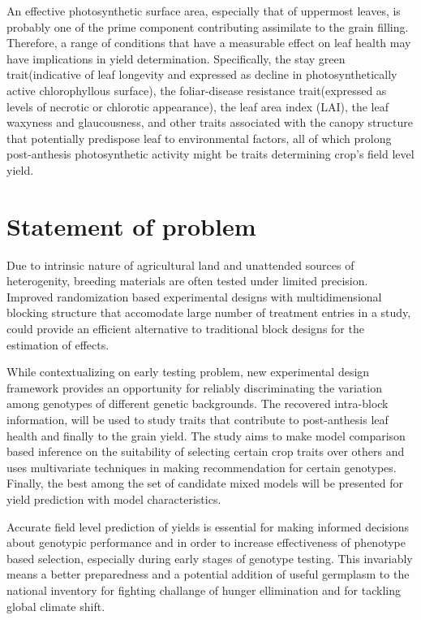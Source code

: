\documentclass[12pt,oneside]{dukestatscithesis} %
\begin{document}
An effective photosynthetic surface area, especially that of uppermost leaves, is probably one of the prime component contributing assimilate to the grain filling. Therefore, a range of conditions that have a measurable effect on leaf health may have implications in yield determination. Specifically, the stay green trait(indicative of leaf longevity and expressed as decline in photosynthetically active chlorophyllous surface), the foliar-disease resistance trait(expressed as levels of necrotic or chlorotic appearance), the leaf area index (LAI), the leaf waxyness and glaucousness, and other traits associated with the canopy structure that potentially predispose leaf to environmental factors, all of which prolong post-anthesis photosynthetic activity might be traits determining crop's field level yield.

\hypertarget{statement-of-problem}{%
\section{Statement of problem}\label{statement-of-problem}}

Due to intrinsic nature of agricultural land and unattended sources of heterogenity, breeding materials are often tested under limited precision. Improved randomization based experimental designs with multidimensional blocking structure that accomodate large number of treatment entries in a study, could provide an efficient alternative to traditional block designs for the estimation of effects.

While contextualizing on early testing problem, new experimental design framework provides an opportunity for reliably discriminating the variation among genotypes of different genetic backgrounds. The recovered intra-block information, will be used to study traits that contribute to post-anthesis leaf health and finally to the grain yield. The study aims to make model comparison based inference on the suitability of selecting certain crop traits over others and uses multivariate techniques in making recommendation for certain genotypes. Finally, the best among the set of candidate mixed models will be presented for yield prediction with model characteristics.

Accurate field level prediction of yields is essential for making informed decisions about genotypic performance and in order to increase effectiveness of phenotype based selection, especially during early stages of genotype testing. This invariably means a better preparedness and a potential addition of useful germplasm to the national inventory for fighting challange of hunger ellimination and for tackling global climate shift.
\end{document}
